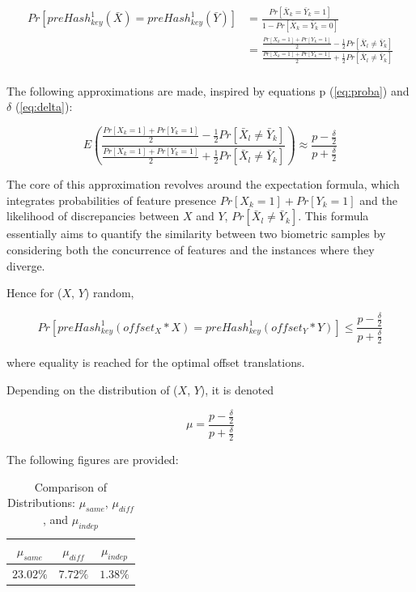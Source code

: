 \begin{equation} \label{eq:preHash2}
    \begin{aligned}
        Pr[preHash_{key}^1(\bar{X}) = preHash_{key}^1(\bar{Y})] &= \frac{Pr[\bar{X}_k = \bar{Y}_k = 1]}{1 - Pr[\bar{X}_k = \bar{Y}_k = 0]}\\
        &= \frac{\frac{Pr[X_k = 1] + Pr[Y_k = 1]}{2} - \frac{1}{2}Pr[\bar{X}_l \neq \bar{Y}_k]}{\frac{Pr[X_k = 1] + Pr[Y_k = 1]}{2} + \frac{1}{2}Pr[\bar{X}_l \neq \bar{Y}_k]}\\
    \end{aligned}
\end{equation}

The following approximations are made, inspired by equations p (\ref{eq:proba}) and $\delta$ (\ref{eq:delta}):

\begin{equation}
    E\left(\frac{\frac{Pr[X_k = 1] + Pr[Y_k = 1]}{2} - \frac{1}{2}Pr[\bar{X}_l \neq \bar{Y}_k]}{\frac{Pr[X_k = 1] + Pr[Y_k = 1]}{2} + \frac{1}{2}Pr[\bar{X}_l \neq \bar{Y}_k]}\right) \approx \frac{p - \frac{\delta}{2}}{p + \frac{\delta}{2}}
\end{equation}

The core of this approximation revolves around the expectation formula, which integrates probabilities of feature presence \(Pr[X_k=1]+Pr[Y_k=1]\) and the likelihood of discrepancies between \(X\) and \(Y\), \(Pr[\bar{X}_l \neq \bar{Y}_k]\). This formula essentially aims to quantify the similarity between two biometric samples by considering both the concurrence of features and the instances where they diverge.

Hence for (\(X\), \(Y\)) random,

\begin{equation}
    \label{eq:mu_leq}
    Pr[preHash_{key}^1(offset_X * X) = preHash_{key}^1(offset_Y * Y)] \leq \frac{p - \frac{\delta}{2}}{p + \frac{\delta}{2}}
\end{equation}

where equality is reached for the optimal offset translations. 

Depending on the distribution of (\(X\), \(Y\)), it is denoted

\begin{equation} \label{eq:mu}
    \mu = \frac{p - \frac{\delta}{2}}{p + \frac{\delta}{2}}
\end{equation}

The following figures are provided:

\begin{table}[H]
    \centering
    \renewcommand{\arraystretch}{1.25}\begin{tabular}{|c|c|c|}
        \hline
        $\mu_{same}$ & $\mu_{diff}$ & $\mu_{indep}$\\
        \hline
        $23.02\%$ & $7.72\%$ & $1.38\%$\\
        \hline
    \end{tabular}
\caption{Comparison of Distributions: $\mu_{same}$, $\mu_{diff}$, and $\mu_{indep}$}
\end{table}

